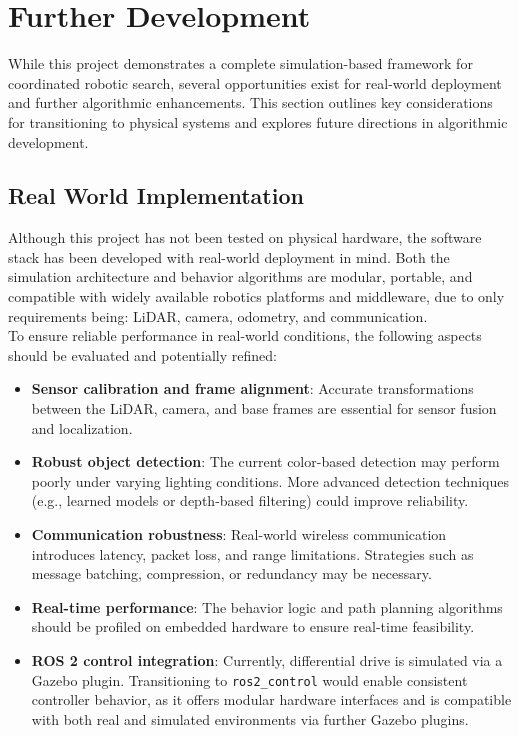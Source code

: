 \section{Further Development}
While this project demonstrates a complete simulation-based framework for coordinated robotic search, several opportunities exist for real-world deployment and further algorithmic enhancements. This section outlines key considerations for transitioning to physical systems and explores future directions in algorithmic development.

\subsection{Real World Implementation}
Although this project has not been tested on physical hardware, the software stack has been developed with real-world deployment in mind. Both the simulation architecture and behavior algorithms are modular, portable, and compatible with widely available robotics platforms and middleware, due to only requirements being: LiDAR, camera, odometry, and communication.\\

To ensure reliable performance in real-world conditions, the following aspects should be evaluated and potentially refined:

\begin{itemize}
  \item \textbf{Sensor calibration and frame alignment}: Accurate transformations between the LiDAR, camera, and base frames are essential for sensor fusion and localization.
  \item \textbf{Robust object detection}: The current color-based detection may perform poorly under varying lighting conditions. More advanced detection techniques (e.g., learned models or depth-based filtering) could improve reliability.
  \item \textbf{Communication robustness}: Real-world wireless communication introduces latency, packet loss, and range limitations. Strategies such as message batching, compression, or redundancy may be necessary.
  \item \textbf{Real-time performance}: The behavior logic and path planning algorithms should be profiled on embedded hardware to ensure real-time feasibility.
  \item \textbf{ROS 2 control integration}: Currently, differential drive is simulated via a Gazebo plugin. Transitioning to \texttt{ros2\_control} \cite{ros2-control} would enable consistent controller behavior, as it offers modular hardware interfaces and is compatible with both real and simulated environments via further Gazebo plugins.
\end{itemize}

